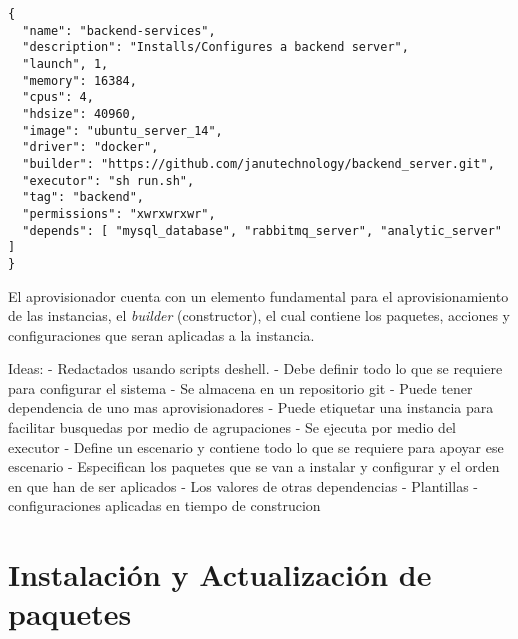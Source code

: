 \vspace{5mm}

\begin{lstlisting}[style=json, caption=Ejemplo de un aprovisionador]
{
  "name": "backend-services",
  "description": "Installs/Configures a backend server",
  "launch", 1,
  "memory": 16384,
  "cpus": 4,
  "hdsize": 40960,
  "image": "ubuntu_server_14",
  "driver": "docker",
  "builder": "https://github.com/janutechnology/backend_server.git",
  "executor": "sh run.sh",
  "tag": "backend",
  "permissions": "xwrxwrxwr",
  "depends": [ "mysql_database", "rabbitmq_server", "analytic_server" ]
}
\end{lstlisting}

\vspace{5mm}

El aprovisionador cuenta con un elemento fundamental para el aprovisionamiento de las instancias, el \emph{builder} (constructor), el cual contiene los paquetes, acciones y configuraciones que seran aplicadas a la instancia.



Ideas:
- Redactados usando scripts deshell.
- Debe definir todo lo que se requiere para configurar el sistema
- Se almacena en un repositorio git
- Puede tener dependencia de uno mas aprovisionadores
- Puede etiquetar una instancia para facilitar busquedas por medio de agrupaciones
- Se ejecuta por medio del executor
- Define un escenario y contiene todo lo que se requiere para apoyar ese escenario
  - Especifican los paquetes que se van a instalar y configurar y el orden en que han de ser aplicados
  - Los valores de otras dependencias
  - Plantillas
- configuraciones aplicadas en tiempo de construcion



\section{Instalación y Actualización de paquetes}




